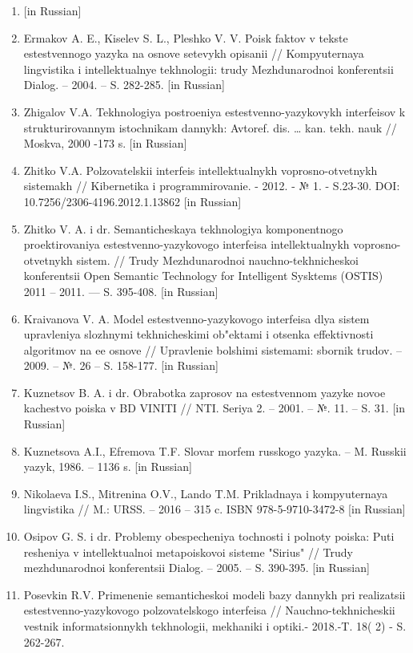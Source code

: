 \begin{enumerate}
\def\labelenumi{\arabic{enumi}.}
\item
  {[}in Russian{]}
\item
  Ermakov A. E., Kiselev S. L., Pleshko V. V. Poisk faktov v tekste
  estestvennogo yazyka na osnove setevykh opisanii //
  Komp\textquotesingle yuternaya lingvistika i
  intellektual\textquotesingle nye tekhnologii: trudy Mezhdunarodnoi
  konferentsii Dialog. -- 2004. -- S. 282-285. {[}in Russian{]}
\item
  Zhigalov V.A. Tekhnologiya postroeniya estestvenno-yazykovykh
  interfeisov k strukturirovannym istochnikam dannykh: Avtoref. dis.
  \ldots{} kan. tekh. nauk // Moskva, 2000 -173 s. {[}in Russian{]}
\item
  Zhitko V.A. Pol\textquotesingle zovatel\textquotesingle skii interfeis
  intellektual\textquotesingle nykh voprosno-otvetnykh sistemakh //
  Kibernetika i programmirovanie. - 2012. - № 1. - S.23-30. DOI:
  10.7256/2306-4196.2012.1.13862 {[}in Russian{]}
\item
  Zhitko V. A. i dr. Semanticheskaya tekhnologiya komponentnogo
  proektirovaniya estestvenno-yazykovogo interfeisa
  intellektual\textquotesingle nykh voprosno-otvetnykh sistem. // Trudy
  Mezhdunarodnoi nauchno-tekhnicheskoi konferentsii Open Semantic
  Technology for Intelligent Sysktems (OSTIS) 2011 -- 2011. --- S.
  395-408. {[}in Russian{]}
\item
  Kraivanova V. A. Model\textquotesingle{} estestvenno-yazykovogo
  interfeisa dlya sistem upravleniya slozhnymi tekhnicheskimi ob"ektami
  i otsenka effektivnosti algoritmov na ee osnove // Upravlenie
  bol\textquotesingle shimi sistemami: sbornik trudov. -- 2009. -- №. 26
  -- S. 158-177. {[}in Russian{]}
\item
  Kuznetsov B. A. i dr. Obrabotka zaprosov na estestvennom yazyke novoe
  kachestvo poiska v BD VINITI // NTI. Seriya 2. -- 2001. -- №. 11. --
  S. 31. {[}in Russian{]}
\item
  Kuznetsova A.I., Efremova T.F. Slovar\textquotesingle{} morfem
  russkogo yazyka. -- M. Russkii yazyk, 1986. -- 1136 s. {[}in
  Russian{]}
\item
  Nikolaeva I.S., Mitrenina O.V., Lando T.M. Prikladnaya i
  komp\textquotesingle yuternaya lingvistika // M.: URSS. -- 2016 -- 315
  c. ISBN 978-5-9710-3472-8 {[}in Russian{]}
\item
  Osipov G. S. i dr. Problemy obespecheniya tochnosti i polnoty poiska:
  Puti resheniya v intellektual\textquotesingle noi metapoiskovoi
  sisteme "Sirius" // Trudy mezhdunarodnoi konferentsii Dialog. -- 2005.
  -- S. 390-395. {[}in Russian{]}
\item
  Posevkin R.V. Primenenie semanticheskoi modeli bazy dannykh pri
  realizatsii estestvenno-yazykovogo
  pol\textquotesingle zovatel\textquotesingle skogo interfeisa //
  Nauchno-tekhnicheskii vestnik informatsionnykh tekhnologii, mekhaniki
  i optiki.- 2018.-T. 18( 2) - S. 262-267.
\end{enumerate}

